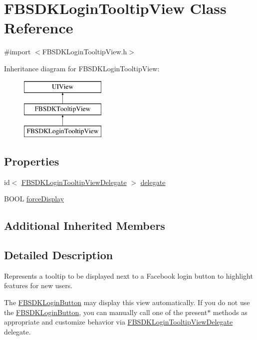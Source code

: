 \hypertarget{interface_f_b_s_d_k_login_tooltip_view}{}\section{F\+B\+S\+D\+K\+Login\+Tooltip\+View Class Reference}
\label{interface_f_b_s_d_k_login_tooltip_view}


{\ttfamily \#import $<$F\+B\+S\+D\+K\+Login\+Tooltip\+View.\+h$>$}

Inheritance diagram for F\+B\+S\+D\+K\+Login\+Tooltip\+View\+:\begin{figure}[H]
\begin{center}
\leavevmode
\includegraphics[height=3.000000cm]{interface_f_b_s_d_k_login_tooltip_view}
\end{center}
\end{figure}
\subsection*{Properties}
\begin{DoxyCompactItemize}
\item 
id$<$ \hyperlink{protocol_f_b_s_d_k_login_tooltip_view_delegate-p}{F\+B\+S\+D\+K\+Login\+Tooltip\+View\+Delegate} $>$ \hyperlink{interface_f_b_s_d_k_login_tooltip_view_a8f0879fab37905fb4b8f29515a055c00}{delegate}
\item 
B\+O\+O\+L \hyperlink{interface_f_b_s_d_k_login_tooltip_view_a5d7116f500f006d7d1d0d5c826b0b493}{force\+Display}
\end{DoxyCompactItemize}
\subsection*{Additional Inherited Members}


\subsection{Detailed Description}
Represents a tooltip to be displayed next to a Facebook login button to highlight features for new users.

The {\ttfamily \hyperlink{interface_f_b_s_d_k_login_button}{F\+B\+S\+D\+K\+Login\+Button}} may display this view automatically. If you do not use the {\ttfamily \hyperlink{interface_f_b_s_d_k_login_button}{F\+B\+S\+D\+K\+Login\+Button}}, you can manually call one of the {\ttfamily present$\ast$} methods as appropriate and customize behavior via {\ttfamily \hyperlink{protocol_f_b_s_d_k_login_tooltip_view_delegate-p}{F\+B\+S\+D\+K\+Login\+Tooltip\+View\+Delegate}} delegate.

